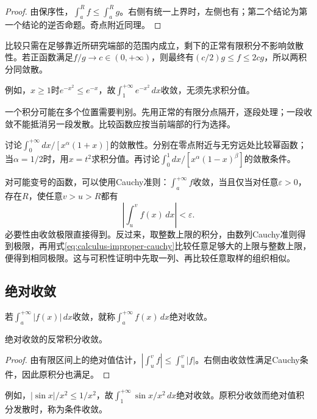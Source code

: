 \begin{proof}
由保序性，\(\int_a^Rf\le\int_a^Rg\)。右侧有统一上界时，左侧也有；第二个结论为第一个结论的逆否命题。奇点附近同理。
\end{proof}

比较只需在足够靠近所研究端部的范围内成立，剩下的正常有限积分不影响敛散性。若正函数满足\(f/g\to c\in(0,+\infty)\)，则最终有\((c/2)g\le f\le2cg\)，所以两积分同敛散。

例如，\(x\ge1\)时\(e^{-x^2}\le e^{-x}\)，故\(\int_1^{+\infty}e^{-x^2}\,dx\)收敛，无须先求积分值。

一个积分可能在多个位置需要判别。先用正常的有限分点隔开，逐段处理；一段收敛不能抵消另一段发散。比较函数应按当前端部的行为选择。

\begin{example}
讨论\(\int_0^{+\infty}dx/[x^\alpha(1+x)]\)的敛散性。分别在零点附近与无穷远处比较幂函数；当\(\alpha=1/2\)时，用\(x=t^2\)求积分值。再讨论\(\int_0^1dx/[x^\alpha(1-x)^\beta]\)的敛散条件。
\end{example}

对可能变号的函数，可以使用Cauchy准则：\(\int_a^{+\infty}f\)收敛，当且仅当对任意\(\varepsilon>0\)，存在\(R\)，使任意\(v>u>R\)都有
\begin{equation}\label{eq:calculus-improper-cauchy}
 \left|\int_u^vf(x)\,dx\right|<\varepsilon.
\end{equation}
必要性由收敛极限直接得到。反过来，取整数上限的积分，由数列Cauchy准则得到极限，再用式\eqref{eq:calculus-improper-cauchy}比较任意足够大的上限与整数上限，便得到相同极限。这与可积性证明中先取一列、再比较任意取样的组织相似。

\subsection{绝对收敛}

\begin{definition}
若\(\int_a^{+\infty}|f(x)|\,dx\)收敛，就称\(\int_a^{+\infty}f(x)\,dx\){\heiti{}绝对收敛}。
\end{definition}

\begin{theorem}
绝对收敛的反常积分收敛。
\end{theorem}

\begin{proof}
由有限区间上的绝对值估计，\(|\int_u^vf|\le\int_u^v|f|\)。右侧由收敛性满足Cauchy条件，因此原积分也满足。
\end{proof}

例如，\(|\sin x|/x^2\le1/x^2\)，故\(\int_1^{+\infty}\sin x/x^2\,dx\)绝对收敛。原积分收敛而绝对值积分发散时，称为{\heiti{}条件收敛}。

